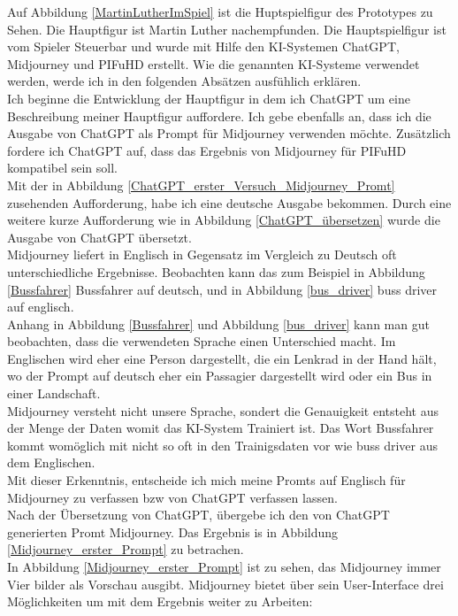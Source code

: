 Auf Abbildung \ref{MartinLutherImSpiel} ist die Huptspielfigur des Prototypes zu Sehen. Die Hauptfigur ist Martin Luther nachempfunden. Die Hauptspielfigur ist vom Spieler Steuerbar und wurde mit Hilfe den KI-Systemen ChatGPT, Midjourney und PIFuHD erstellt. Wie die genannten KI-Systeme verwendet werden, werde ich in den folgenden Absätzen ausfühlich erklären.
\\
Ich beginne die Entwicklung der Hauptfigur in dem ich ChatGPT um eine Beschreibung meiner Hauptfigur auffordere. Ich gebe ebenfalls an, dass ich die Ausgabe von ChatGPT als Prompt für Midjourney verwenden möchte. Zusätzlich fordere ich ChatGPT auf, dass das Ergebnis von Midjourney für PIFuHD kompatibel sein soll.
\\
Mit der in Abbildung \ref{ChatGPT_erster_Versuch_Midjourney_Promt} zusehenden Aufforderung, habe ich eine deutsche Ausgabe bekommen. Durch eine weitere kurze Aufforderung wie in Abbildung \ref{ChatGPT_übersetzen} wurde die Ausgabe von ChatGPT übersetzt.
\\
Midjourney liefert in Englisch in Gegensatz im Vergleich zu Deutsch oft unterschiedliche Ergebnisse. Beobachten kann das zum Beispiel in Abbildung \ref{Bussfahrer} Bussfahrer auf deutsch, und in Abbildung \ref{bus_driver} buss driver auf englisch.
\\
Anhang in Abbildung \ref{Bussfahrer} und Abbildung \ref{bus_driver} kann man gut beobachten, dass die verwendeten Sprache einen Unterschied macht. Im Englischen wird eher eine Person dargestellt, die ein Lenkrad in der Hand hält, wo der Prompt auf deutsch eher ein Passagier dargestellt wird oder ein Bus in einer Landschaft.
\\
Midjourney versteht nicht unsere Sprache, sondert die Genauigkeit entsteht aus der Menge der Daten womit das KI-System Trainiert ist. Das Wort Bussfahrer kommt womöglich mit nicht so oft in den Trainigsdaten vor wie buss driver aus dem Englischen.
\\
Mit dieser Erkenntnis, entscheide ich mich meine Promts auf Englisch für Midjourney zu verfassen bzw von ChatGPT verfassen lassen.
\\
Nach der Übersetzung von ChatGPT, übergebe ich den von ChatGPT generierten Promt Midjourney. Das Ergebnis is in Abbildung \ref{Midjourney_erster_Prompt} zu betrachen.
\\
In Abbildung \ref{Midjourney_erster_Prompt} ist zu sehen, das Midjourney immer Vier bilder als Vorschau ausgibt. Midjourney bietet über sein User-Interface drei Möglichkeiten um mit dem Ergebnis weiter zu Arbeiten:
